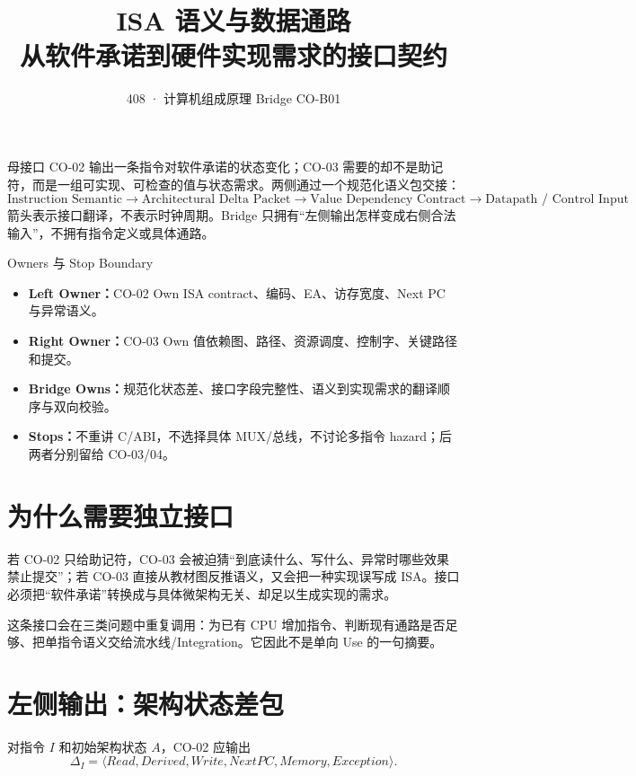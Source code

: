 \documentclass[UTF8,fontset=fandol,11pt,a4paper]{ctexart}
\title{\vspace{-1.1cm}\textbf{ISA 语义与数据通路}\\[0.4em]
\large 从软件承诺到硬件实现需求的接口契约}
\author{408 · 计算机组成原理 Bridge CO-B01}
\date{}
\newcommand{\kw}[1]{\textbf{\color{deep}#1}}
\begin{document}
\maketitle

\begin{corebox}{母接口}
CO-02 输出一条指令对软件承诺的状态变化；CO-03 需要的却不是助记符，而是一组可实现、可检查的值与状态需求。两侧通过一个规范化语义包交接：
\[
\boxed{
\text{Instruction Semantic}
\to\text{Architectural Delta Packet}
\to\text{Value Dependency Contract}
\to\text{Datapath / Control Input}}
\]
箭头表示接口翻译，不表示时钟周期。Bridge 只拥有“左侧输出怎样变成右侧合法输入”，不拥有指令定义或具体通路。
\end{corebox}

\begin{methodbox}{Owners 与 Stop Boundary}
\begin{itemize}
  \item \kw{Left Owner：}CO-02 Own ISA contract、编码、EA、访存宽度、Next PC 与异常语义。
  \item \kw{Right Owner：}CO-03 Own 值依赖图、路径、资源调度、控制字、关键路径和提交。
  \item \kw{Bridge Owns：}规范化状态差、接口字段完整性、语义到实现需求的翻译顺序与双向校验。
  \item \kw{Stops：}不重讲 C/ABI，不选择具体 MUX/总线，不讨论多指令 hazard；后两者分别留给 CO-03/04。
\end{itemize}
\end{methodbox}

\tableofcontents

\section{为什么需要独立接口}

若 CO-02 只给助记符，CO-03 会被迫猜“到底读什么、写什么、异常时哪些效果禁止提交”；若 CO-03 直接从教材图反推语义，又会把一种实现误写成 ISA。接口必须把“软件承诺”转换成与具体微架构无关、却足以生成实现的需求。

这条接口会在三类问题中重复调用：为已有 CPU 增加指令、判断现有通路是否足够、把单指令语义交给流水线/Integration。它因此不是单向 Use 的一句摘要。

\section{左侧输出：架构状态差包}

对指令 $I$ 和初始架构状态 $A$，CO-02 应输出
\[
\Delta_I=
\langle
Read, Derived, Write, NextPC, Memory, Exception
\rangle.
\]
\end{document}
